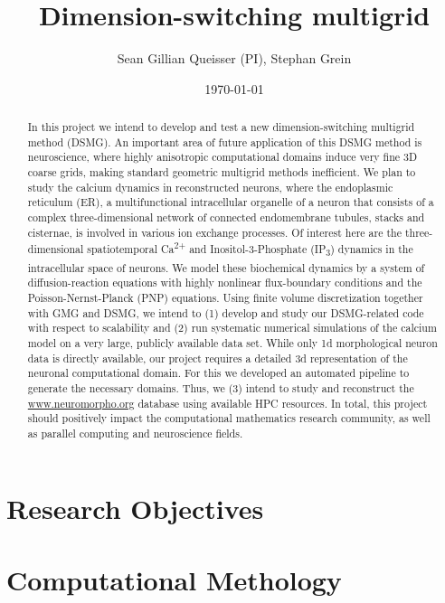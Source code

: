 \documentclass[a4paper, 11pt, notitlepage]{nsf}
\author{Sean Gillian Queisser (PI), Stephan Grein}
\title{Dimension-switching multigrid}
\date{\today}
\begin{document}

\maketitle
\begin{abstract}
In this project we intend to develop and test a new dimension-switching multigrid method (DSMG). An important area of future application of this DSMG method is neuroscience, where highly anisotropic computational domains induce very fine 3D coarse grids, making standard geometric multigrid methods inefficient. We plan to study the calcium dynamics in reconstructed neurons, where the endoplasmic reticulum (ER), a multifunctional intracellular organelle of a neuron that consists of a complex three-dimensional network of connected endomembrane tubules, stacks and cisternae, is involved in various ion exchange processes. Of interest here are the three-dimensional spatiotemporal Ca\textsuperscript{2+} and Inositol-3-Phosphate (IP\textsubscript{3}) dynamics in the intracellular space of neurons. We model these biochemical dynamics by a system of diffusion-reaction equations with highly nonlinear flux-boundary conditions and the Poisson-Nernst-Planck (PNP) equations. Using finite volume discretization together with GMG and DSMG, we intend to (1) develop and study our DSMG-related code with respect to scalability and (2) run systematic numerical simulations of the calcium model on a very large, publicly available data set. While only 1d morphological neuron data is directly available, our project requires a detailed 3d representation of the neuronal computational domain. For this we developed an automated pipeline to generate the necessary domains. Thus, we (3) intend to study and reconstruct the \url{www.neuromorpho.org} database using available HPC resources. In total, this project should positively impact the computational mathematics research community, as well as parallel computing and neuroscience fields.
\end{abstract}


\section{Research Objectives}



\section{Computational Methology}

\end{document}
